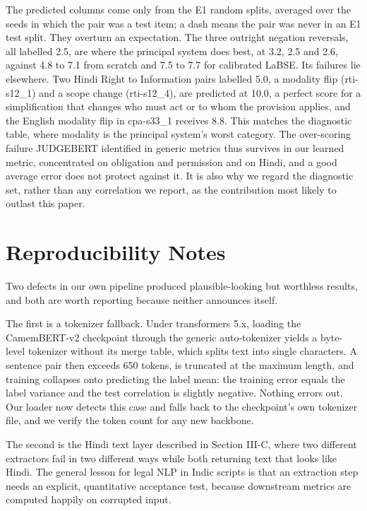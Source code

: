 \documentclass[conference]{IEEEtran}
\begin{document}
The predicted columns come only from the E1 random splits, averaged over the seeds in which the pair was a test item; a dash means the pair was never in an E1 test split. They overturn an expectation. The three outright negation reversals, all labelled 2.5, are where the principal system does best, at 3.2, 2.5 and 2.6, against 4.8 to 7.1 from scratch and 7.5 to 7.7 for calibrated LaBSE. Its failures lie elsewhere. Two Hindi Right to Information pairs labelled 5.0, a modality flip (rti-s12\_1) and a scope change (rti-s12\_4), are predicted at 10.0, a perfect score for a simplification that changes who must act or to whom the provision applies, and the English modality flip in cpa-s33\_1 receives 8.8. This matches the diagnostic table, where modality is the principal system's worst category. The over-scoring failure JUDGEBERT identified in generic metrics thus survives in our learned metric, concentrated on obligation and permission and on Hindi, and a good average error does not protect against it. It is also why we regard the diagnostic set, rather than any correlation we report, as the contribution most likely to outlast this paper.

\section{Reproducibility Notes}

Two defects in our own pipeline produced plausible-looking but worthless results, and both are worth reporting because neither announces itself.

The first is a tokenizer fallback. Under transformers 5.x, loading the CamemBERT-v2 checkpoint through the generic auto-tokenizer yields a byte-level tokenizer without its merge table, which splits text into single characters. A sentence pair then exceeds 650 tokens, is truncated at the maximum length, and training collapses onto predicting the label mean: the training error equals the label variance and the test correlation is slightly negative. Nothing errors out. Our loader now detects this case and falls back to the checkpoint's own tokenizer file, and we verify the token count for any new backbone.

The second is the Hindi text layer described in Section III-C, where two different extractors fail in two different ways while both returning text that looks like Hindi. The general lesson for legal NLP in Indic scripts is that an extraction step needs an explicit, quantitative acceptance test, because downstream metrics are computed happily on corrupted input.
\end{document}
